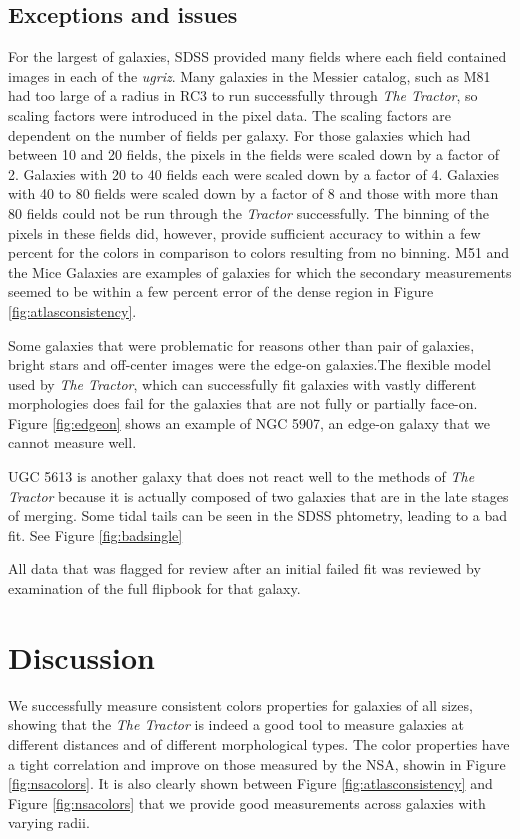 \documentclass[12pt,preprint,pdftex]{aastex}
\begin{document}
\subsection{Exceptions and issues}\label{sec:results}
For the largest of galaxies, SDSS provided many fields where each
field contained images in each of the \textit{ugriz}. Many galaxies in
the Messier catalog, such as M81 had too large of a radius in RC3 to
run successfully through \emph{The Tractor}, so scaling factors were
introduced in the pixel data. The scaling factors are dependent on the
number of fields per galaxy. For those galaxies which had between 10
and 20 fields, the pixels in the fields were scaled down by a factor
of 2. Galaxies with 20 to 40 fields each were scaled down by a factor
of 4. Galaxies with 40 to 80 fields were scaled down by a factor of 8
and those with more than 80 fields could not be run through the
\textit{Tractor} successfully. The binning of the pixels in these fields
did, however, provide sufficient accuracy to within a few percent for
the colors in comparison to colors resulting from no binning.
 M51 and the Mice Galaxies are examples of galaxies for which the
 secondary measurements seemed to be within a few percent error of the
 dense region in Figure \ref{fig:atlasconsistency}.

Some galaxies that were problematic for reasons other than pair of
galaxies, bright stars and off-center images were the edge-on
galaxies.The flexible model used by \emph{The Tractor}, which can
successfully fit galaxies with vastly different morphologies does fail
for the galaxies that are not fully or partially face-on. Figure
\ref{fig:edgeon} shows an example of NGC 5907, an edge-on galaxy that
we cannot measure well.
 
UGC 5613 is another galaxy that does not react well to the methods of \emph{The Tractor} because it is actually composed of two galaxies that are in the late stages of merging. Some tidal tails can be seen in the SDSS phtometry, leading to a bad fit. See Figure \ref{fig:badsingle}

All data that was flagged for review after an initial failed fit was reviewed by examination of
the full flipbook for that galaxy.

\section{Discussion}\label{sec:discussion}
We successfully measure consistent colors properties for galaxies of all sizes, showing that the \emph{The Tractor} is indeed a good tool to measure galaxies at different distances and of different morphological types. The color properties have a tight correlation and improve on those measured by the NSA, showin in Figure \ref{fig:nsacolors}. It is also clearly shown between Figure \ref{fig:atlasconsistency} and Figure \ref{fig:nsacolors} that we provide good measurements across galaxies with varying radii.
\end{document}
